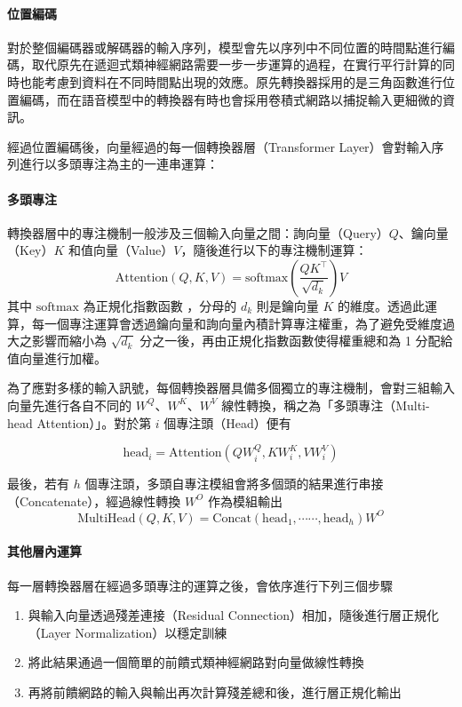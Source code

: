 \paragraph{位置編碼}

對於整個編碼器或解碼器的輸入序列，模型會先以序列中不同位置的時間點進行編碼，取代原先在遞迴式類神經網路需要一步一步運算的過程，在實行平行計算的同時也能考慮到資料在不同時間點出現的效應。原先轉換器採用的是三角函數進行位置編碼，而在語音模型中的轉換器有時也會採用卷積式網路以捕捉輸入更細微的資訊。

經過位置編碼後，向量經過的每一個轉換器層（Transformer Layer）會對輸入序列進行以多頭專注為主的一連串運算：

\paragraph{多頭專注}

轉換器層中的專注機制一般涉及三個輸入向量之間：詢向量（Query）$Q$、鑰向量（Key）$K$ 和值向量（Value）$V$，隨後進行以下的專注機制運算：
\[\text{Attention}(Q, K, V) = \text{softmax}
\left(
\frac{QK^\top}{\sqrt{d_k}}
\right)
V\]
其中 $ \text{softmax}$ 為正規化指數函數 ，分母的 $d_k$  則是鑰向量 $K$ 的維度。透過此運算，每一個專注運算會透過鑰向量和詢向量內積計算專注權重，為了避免受維度過大之影響而縮小為 $\sqrt{d_k}$ 分之一後，再由正規化指數函數使得權重總和為 1 分配給值向量進行加權。

為了應對多樣的輸入訊號，每個轉換器層具備多個獨立的專注機制，會對三組輸入向量先進行各自不同的 $W^Q$、$W^K$、$W^V$ 線性轉換，稱之為「多頭專注（Multi-head Attention）」。對於第 $i$ 個專注頭（Head）便有

$$\text{head}_i = \text{Attention}(QW^Q_i,KW^K_i,VW^V_i)$$

最後，若有 $h$ 個專注頭，多頭自專注模組會將多個頭的結果進行串接（Concatenate），經過線性轉換 $W^O$ 作為模組輸出
$$\text{MultiHead}(Q, K, V) = \text{Concat}(\text{head}_1, \cdots\cdots, \text{head}_h) W^O$$

\paragraph{其他層內運算}

每一層轉換器層在經過多頭專注的運算之後，會依序進行下列三個步驟

\begin{enumerate}
\item 與輸入向量透過殘差連接（Residual Connection）相加，隨後進行層正規化（Layer Normalization）以穩定訓練
\item 將此結果通過一個簡單的前饋式類神經網路對向量做線性轉換
\item 再將前饋網路的輸入與輸出再次計算殘差總和後，進行層正規化輸出
\end{enumerate}

